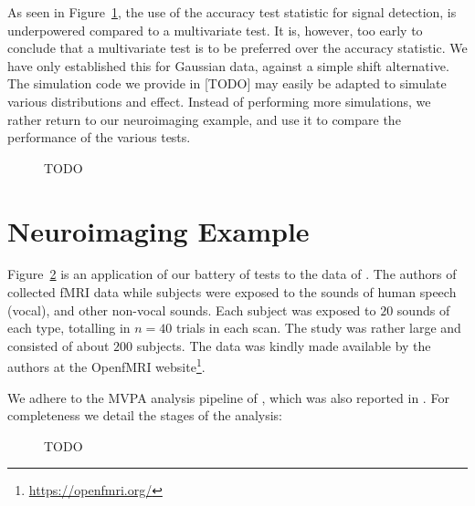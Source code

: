\documentclass[12pt,a4paper]{article}
\begin{document}
As seen in Figure~\ref{fig:simulation_2}, the use of the accuracy test statistic for signal detection, is underpowered compared to a multivariate test. 
It is, however, too early to conclude that a multivariate test is to be preferred over the accuracy statistic. We have only established this for Gaussian data, against a simple shift alternative. 
The simulation code we provide in [TODO] may easily be adapted to simulate various distributions and effect. 
Instead of performing more simulations, we rather return to our neuroimaging example, and use it to compare the performance of the various tests. 

\begin{figure}[h]
\centering
\caption{
	\label{fig:simulation_2}
	TODO}
\end{figure}





\section{Neuroimaging Example}
\label{sec:example}

Figure~\ref{fig:read_data} is an application of our battery of tests to the data of \cite{pernet_human_2015}. 
The authors of \cite{pernet_human_2015} collected fMRI data while subjects were exposed to the sounds of human speech (vocal), and other non-vocal sounds. 
Each subject was exposed to $20$ sounds of each type, totalling in $n=40$ trials in each scan.
The study was rather large and consisted of about $200$ subjects.
The data was kindly made available by the authors at the OpenfMRI website\footnote{\url{https://openfmri.org/}}.

We adhere to the MVPA analysis pipeline of \cite{stelzer_statistical_2013}, which was also reported in \cite{gilron_quantifying_2016}. 
For completeness we detail the stages of the analysis:






\begin{figure}[h]
\centering
\caption{
	\label{fig:read_data}
	TODO}
\end{figure}








\end{document}

